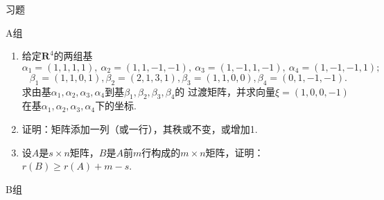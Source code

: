 \centerline{\heiti \Large 习题}
\vspace{2ex}
{\kaishu }
\begin{flushright}
    \kaishu

\end{flushright}
\centerline{\heiti A组}
\begin{enumerate}
    \item 给定$\mathbf{R}^4$的两组基
	\[\alpha_1=(1,1,1,1),\ \alpha_2=(1,1,-1,-1),\ \alpha_3=(1,-1,1,-1),\ \alpha_4=(1,-1,-1,1);\]
	\[\beta_1=(1,1,0,1),\beta_2=(2,1,3,1),\beta_3=(1,1,0,0),\beta_4=(0,1,-1,-1).\]
	求由基$\alpha_1,\alpha_2,\alpha_3,\alpha_4$到基$\beta_1,\beta_2,\beta_3,\beta_4$的
	过渡矩阵，并求向量$\xi=(1,0,0,-1)$在基$\alpha_1,\alpha_2,\alpha_3,\alpha_4$下的坐标.
    \item 证明：矩阵添加一列（或一行），其秩或不变，或增加1.
	\item 设$A$是$s \times n$矩阵，$B$是$A$前$m$行构成的$m \times n$矩阵，证明：
	$r(B) \ge r(A) + m - s$.
\end{enumerate}
\centerline{\heiti B组}
